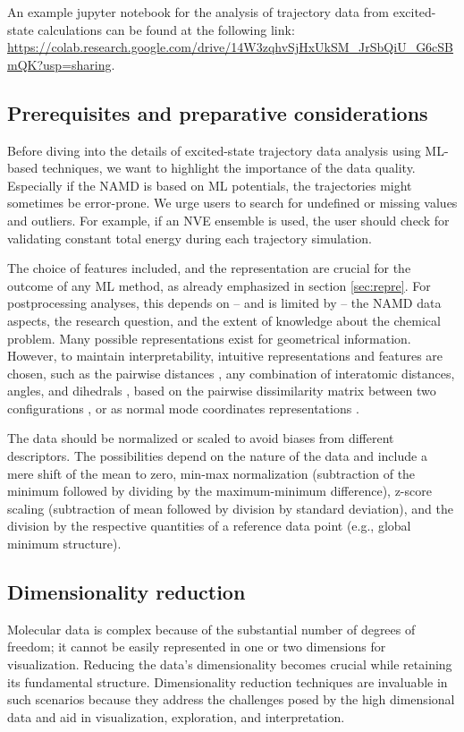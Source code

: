 \documentclass[9pt,bestpractices]{livecoms}
\begin{document}
An example jupyter notebook for the analysis of trajectory data from excited-state calculations can be found at the following link: \url{https://colab.research.google.com/drive/14W3zqhvSjHxUkSM_JrSbQiU_G6cSBmQK?usp=sharing}. 

\subsection{Prerequisites and preparative considerations}
\label{sec:preparepostprocess}
Before diving into the details of excited-state trajectory data analysis using ML-based techniques, we want to highlight the importance of the data quality. Especially if the NAMD is based on ML potentials, the trajectories might sometimes be error-prone. We urge users to search for undefined or missing values and outliers. For example, if an NVE ensemble is used, the user should check for validating constant total energy during each trajectory simulation. 
 
The choice of features included, and the representation are crucial for the outcome of any ML method, as already emphasized in section \ref{sec:repre}. For postprocessing analyses, this depends on – and is limited by – the NAMD data aspects, the research question, and the extent of knowledge about the chemical problem. Many possible representations exist for geometrical information. However, to maintain interpretability, intuitive representations and features are chosen, such as the pairwise distances \cite{RN23}, any combination of interatomic distances, angles, and dihedrals \cite{RN22}, based on the pairwise dissimilarity matrix between two configurations \cite{RN21}, or as normal mode coordinates representations \cite{RN144, Hase2020}.

The data should be normalized or scaled to avoid biases from different descriptors. The possibilities depend on the nature of the data and include a mere shift of the mean to zero, min-max normalization (subtraction of the minimum followed by dividing by the maximum-minimum difference), z-score scaling (subtraction of mean followed by division by standard deviation), and the division by the respective quantities of a reference data point (e.g., global minimum structure).

\subsection{Dimensionality reduction}
\label{sec:dimred}

Molecular data is complex because of the substantial number of degrees of freedom; it cannot be easily represented in one or two dimensions for visualization. Reducing the data's dimensionality becomes crucial while retaining its fundamental structure. Dimensionality reduction techniques are invaluable in such scenarios because they address the challenges posed by the high dimensional data and aid in visualization, exploration, and interpretation.
\end{document}
